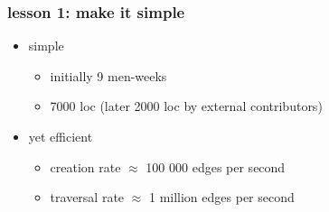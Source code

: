 \documentclass{beamer}
\newcommand{\monvert}[1]{{\color{blue}#1}}
\newcommand{\ocamlgraph}{\textsf{OCamlGraph}}
\newcommand{\present}{{\monvert{\large\boldmath $\surd$}}}
\newcommand{\absent}{\textcolor{red}{\large\boldmath $\oslash$}}
\let\emph\alert
\begin{document}

\begin{frame}\frametitle{lesson 1: make it simple}
  \begin{itemize}
  \item simple
    \begin{itemize}
    \item initially 9 men-weeks
    \item 7000 loc (later 2000 loc by external contributors)
    \end{itemize}

    \bigskip
  \item yet efficient
    \begin{itemize}
    \item creation rate $\approx$ 100 000 edges per second
    \item traversal rate $\approx$ 1 million edges per second
    \end{itemize}
  \end{itemize}
\end{frame}
\end{document}
